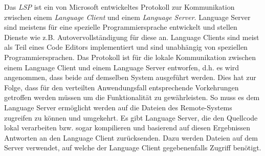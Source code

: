 Das \textit{\ac{LSP}} \cite{noauthor_language-server-protocol_nodate} ist ein von Microsoft entwickeltes Protokoll zur Kommunikation zwischen einem \textit{Language Client} und einem \textit{Language Server}. Language Server sind meistens für eine spezielle Programmiersprache entwickelt und stellen Dienste wie z.B. Autovervollständigung für diese an. Language Clients sind meist als Teil eines Code Editors implementiert und sind unabhängig von speziellen Programmiersprachen. Das Protokoll ist für die lokale Kommunikation zwischen einem Language Client und einem Language Server entworfen, d.h. es wird angenommen, dass beide auf demselben System ausgeführt werden. Dies hat zur Folge, dass für den verteilten Anwendungsfall entsprechende Vorkehrungen getroffen werden müssen um die Funktionalität zu gewährleisten. So muss es dem Language Server ermöglicht werden auf die Dateien des Remote-Systems zugreifen zu können und umgekehrt. Es gibt Language Server, die den Quellcode lokal verarbeiten bzw. sogar kompilieren und basierend auf diesen Ergebnissen Antworten an den Language Client zurücksenden. Dazu werden Dateien auf dem Server verwendet, auf welche der Language Client gegebenenfalls Zugriff benötigt.